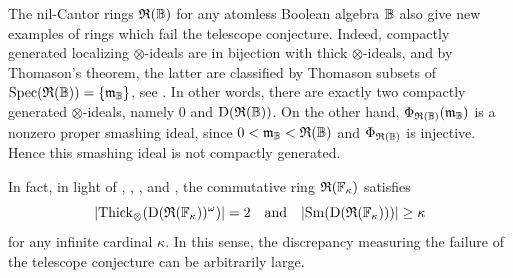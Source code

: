 \documentclass{amsart}
\begin{document}
    \begin{Rem}
        The nil-Cantor rings $\mathfrak{R}(\mathbb{B})$ for any atomless Boolean algebra $\mathbb{B}$ also give new examples of rings which fail the telescope conjecture. Indeed, compactly generated localizing $\otimes$-ideals are in bijection with thick $\otimes$-ideals, and by Thomason's theorem, the latter are classified by Thomason subsets of $\operatorname{Spec}(\mathfrak{R}(\mathbb{B})) = \{ \mathfrak m_{\mathbb{B}} \}$, see . In other words, there are exactly two compactly generated $\otimes$-ideals, namely $0$ and $\operatorname{D}(\mathfrak{R}(\mathbb{B}))$. On the other hand, $\Phi_{\mathfrak{R}(\mathbb{B})}(\mathfrak m_{\mathbb{B}})$ is a nonzero proper smashing ideal, since $0 < \mathfrak m_{\mathbb{B}} < \mathfrak{R}(\mathbb{B})$ and $\Phi_{\mathfrak{R}(\mathbb{B})}$ is injective. Hence this smashing ideal is not compactly generated. 
        
        In fact, in light of , , , and , the commutative ring $\mathfrak{R}(\mathbb{F}_{\kappa})$ satisfies
            \[
                \lvert\mathrm{Thick}_{\otimes}(\operatorname{D}(\mathfrak{R}(\mathbb{F}_{\kappa}))^{\omega})\rvert = 2 \quad \text{and} \quad \lvert \operatorname{Sm}(\operatorname{D}(\mathfrak{R}(\mathbb{F}_{\kappa}))) \rvert \geq \kappa
            \]
        for any infinite cardinal $\kappa$. In this sense, the discrepancy measuring the failure of the telescope conjecture can be arbitrarily large.
    \end{Rem}
    \printbibliography
    
\end{document}
